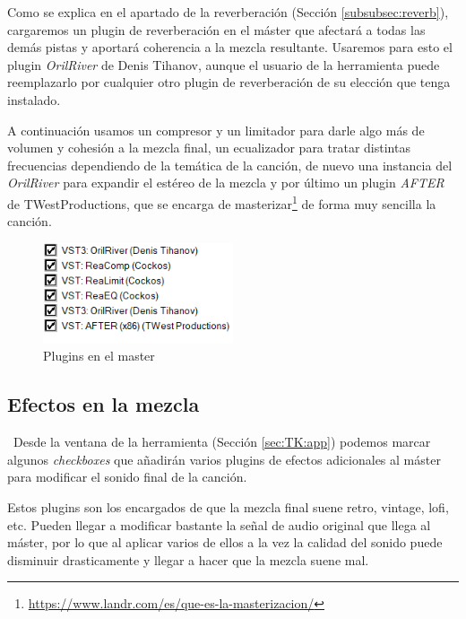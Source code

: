 Como se explica en el apartado de la reverberación (Sección \ref{subsubsec:reverb}), cargaremos un plugin de reverberación en el máster que afectará a todas las demás pistas y aportará coherencia a la mezcla resultante. Usaremos para esto el plugin \textit{OrilRiver} de Denis Tihanov, aunque el usuario de la herramienta puede reemplazarlo por cualquier otro plugin de reverberación de su elección que tenga instalado.

A continuación usamos un compresor y un limitador para darle algo más de volumen y cohesión a la mezcla final, un ecualizador para tratar distintas frecuencias dependiendo de la temática de la canción, de nuevo una instancia del \textit{OrilRiver} para expandir el estéreo de la mezcla y por último un plugin \textit{AFTER} de TWestProductions, que se encarga de masterizar\footnote{\url{https://www.landr.com/es/que-es-la-masterizacion/}} de forma muy sencilla la canción.


\begin{figure}[h]
    \centering
    \includegraphics[width = 0.5\textwidth]{Imagenes/Bitmap/EfectosMaster.png}
    \caption{Plugins en el master}
    \label{fig:Efectos-master}
\end{figure}    

    \subsection{Efectos en la mezcla}\
Desde la ventana de la herramienta (Sección \ref{sec:TK:app}) podemos marcar algunos \textit{checkboxes} que añadirán varios plugins de efectos adicionales al máster para modificar el sonido final de la canción.

Estos plugins son los encargados de que la mezcla final suene retro, vintage, lofi, etc. Pueden llegar a modificar bastante la señal de audio original que llega al máster, por lo que al aplicar varios de ellos a la vez la calidad del sonido puede disminuir drasticamente y llegar a hacer que la mezcla suene mal.



